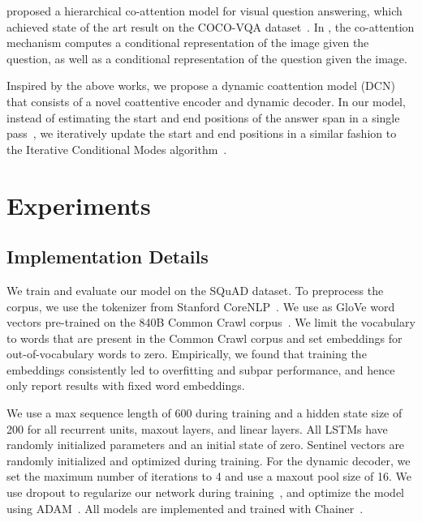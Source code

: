\documentclass{article} \usepackage{iclr2017_conference,times}
\newcommand{\ours}{DCN\xspace}
\begin{document}
\citet{lu2016hierarchical} proposed a hierarchical co-attention model for visual question answering, which achieved state of the art result on the COCO-VQA dataset~\citep{antol2015vqa}. In \citep{lu2016hierarchical}, the co-attention mechanism computes a conditional representation of the image given the question, as well as a conditional representation of the question given the image.

Inspired by the above works, we propose a dynamic coattention model (\ours) that consists of a novel coattentive encoder and dynamic decoder. In our model, instead of estimating the start and end positions of the answer span in a single pass~\citep{wang2016machine}, we iteratively update the start and end positions in a similar fashion to the Iterative Conditional Modes algorithm~\citep{besag1986statistical}.



\section{Experiments}

\subsection{Implementation Details}
\label{sec:implementation}

We train and evaluate our model on the SQuAD dataset.
To preprocess the corpus, we use the tokenizer from Stanford CoreNLP~\citep{manning2014stanford}.
We use as GloVe word vectors pre-trained on the 840B Common Crawl corpus~\citep{pennington2014glove}.
We limit the vocabulary to words that are present in the Common Crawl corpus and set embeddings for out-of-vocabulary words to zero. 
Empirically, we found that training the embeddings consistently led to overfitting and subpar performance, and hence only report results with fixed word embeddings.

We use a max sequence length of 600 during training and a hidden state size of 200 for all recurrent units, maxout layers, and linear layers.
All LSTMs have randomly initialized parameters and an initial state of zero.
Sentinel vectors are randomly initialized and optimized during training.
For the dynamic decoder, we set the maximum number of iterations to 4 and use a maxout pool size of 16.
We use dropout to regularize our network during training~\citep{srivastava2014dropout},
and optimize the model using ADAM~\citep{kingma2014adam}.
All models are implemented and trained with Chainer~\citep{tokui2015chainer}.
\end{document}
